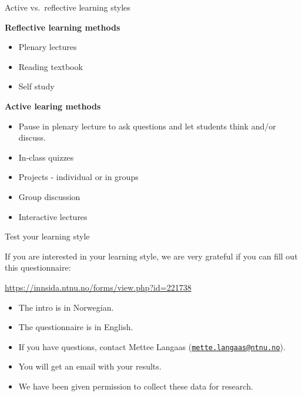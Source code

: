 \documentclass[10pt,ignorenonframetext,]{beamer}
\providecommand{\tightlist}{%
  \setlength{\itemsep}{0pt}\setlength{\parskip}{0pt}}
\begin{document}
\begin{frame}

\begin{block}{Active vs.~reflective learning styles}

\vspace{2mm}

\textbf{Reflective learning methods}

\begin{itemize}
\tightlist
\item
  Plenary lectures
\item
  Reading textbook
\item
  Self study
\end{itemize}

\vspace{4mm}

\textbf{Active learing methods}

\begin{itemize}
\tightlist
\item
  Pause in plenary lecture to ask questions and let students think
  and/or discuss.
\item
  In-class quizzes 
\item
  Projects - individual or in groups
\item
  Group discussion
\item
  Interactive lectures
\end{itemize}

\end{block}

\end{frame}

\begin{frame}{Test your learning style}

\vspace{2mm}

If you are interested in your learning style, we are very grateful if
you can fill out this questionnaire:

\url{https://innsida.ntnu.no/forms/view.php?id=221738}

\begin{itemize}
\tightlist
\item
  The intro is in Norwegian.
\item
  The questionnaire is in English.
\item
  If you have questions, contact Mettee Langaas
  (\href{mailto:mette.langaas@ntnu.no}{\nolinkurl{mette.langaas@ntnu.no}}).
\item
  You will get an email with your results.
\item
  We have been given permission to collect these data for research.
\end{itemize}

\end{frame}
\end{document}
